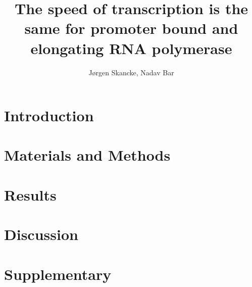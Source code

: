 \documentclass[12pt]{article}
\author{J\o rgen Skancke, Nadav Bar}
\title{The speed of transcription is the same for promoter bound and
elongating RNA polymerase}
\begin{document}
\maketitle

\begin{abstract}

\end{abstract}

\section{Introduction}


\section{Materials and Methods}


\section{Results}


\section{Discussion}

\section{Supplementary}




\end{document}

